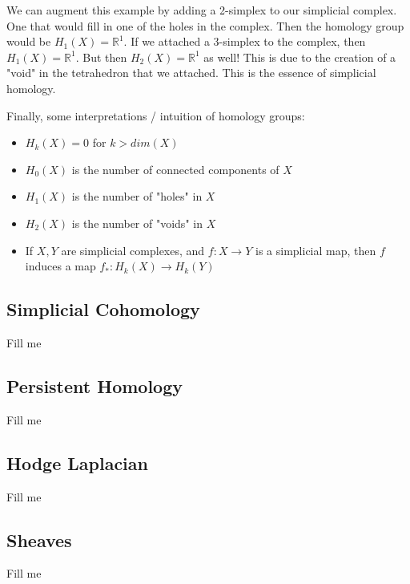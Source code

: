 \documentclass[12pt]{article}
\theoremstyle{plain}
\theoremstyle{definition}
\begin{document}
We can augment this example by adding a 2-simplex to our simplicial complex. One that would fill in one of the holes
in the complex. Then the homology group would be $H_1(X) = \mathbb{R}^1$. If we attached a 3-simplex to the complex, 
then $H_1(X) = \mathbb{R}^1$. But then $H_2(X) = \mathbb{R}^1$ as well! This is due to the creation of a "void" in the
tetrahedron that we attached.  This is the essence of simplicial homology.

Finally, some interpretations / intuition of homology groups:

\begin{itemize}

\item $H_k(X) = 0$ for $k > dim(X)$

\item $H_0(X)$ is the number of connected components of $X$

\item $H_1(X)$ is the number of "holes" in $X$

\item $H_2(X)$ is the number of "voids" in $X$

\item If $X, Y$ are simplicial complexes, and $f: X \to Y$ is a simplicial map, then $f$ induces a map $f_*: H_k(X) \to H_k(Y)$

\end{itemize}


\subsection{Simplicial Cohomology}

Fill me

\subsection{Persistent Homology}

Fill me

\subsection{Hodge Laplacian}

Fill me 

\subsection{Sheaves}

Fill me 
\end{document}
